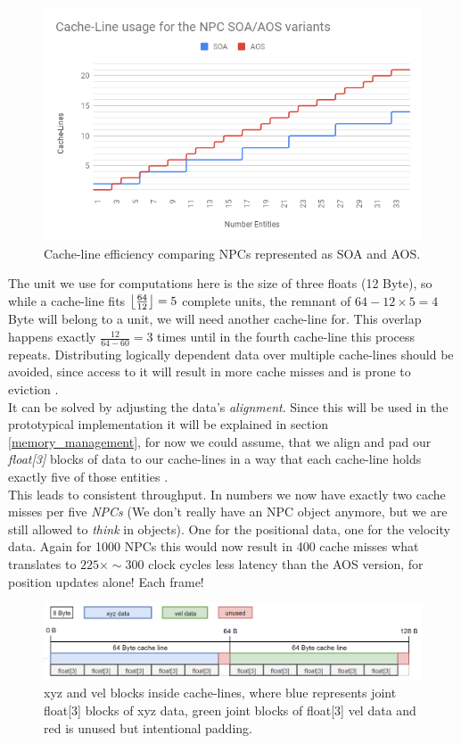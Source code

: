 \subsubsection{}
\begin{figure}
	\centering
	\includegraphics[width=.6\textwidth, height=0.42\textwidth]{PICs/soa_aos_cl_usage}
	\caption{Cache-line efficiency comparing NPCs represented as SOA and AOS.}\label{soa_aos_cl_usage}
\end{figure}
The unit we use for computations here is the size of three floats (12 Byte), so while a cache-line fits $\left \lfloor \frac{64}{12} \right \rfloor=5$ complete units, the remnant of $64-12\times5 = 4$ Byte will belong to a unit, we will need another cache-line for. This overlap happens exactly $\frac{12}{64-60} = 3$ times until in the fourth cache-line this process repeats. Distributing logically dependent data over multiple cache-lines should be avoided, since access to it will result in more cache misses and is prone to eviction .\\
It can be solved by adjusting the data's \textit{alignment}. Since this will be used in the prototypical implementation it will be explained in section \ref{memory_management}, for now we could assume, that we align and pad our \textit{float[3]} blocks of data to our cache-lines in a way that each cache-line holds exactly five of those entities .\\
This leads to consistent throughput. In numbers we now have exactly two cache misses per five \textit{NPCs} (We don't really have an NPC object anymore, but we are still allowed to \textit{think} in objects). One for the positional data, one for the velocity data. Again for 1000 NPCs this would now result in 400 cache misses what translates to $225\times\sim300$ clock cycles less latency than the AOS version, for position updates alone! Each frame!
\begin{figure}[!htbp]
	\centering
	\includegraphics[width=1.0\linewidth, height=0.17\linewidth]{PICs/CacheUtilizationNPCSOA}
	\caption{xyz and vel blocks inside cache-lines, where blue represents joint float[3] blocks of xyz data, green joint blocks of float[3] vel data and red is unused but intentional padding.}\label{cache_utilization_soa}
\end{figure}
